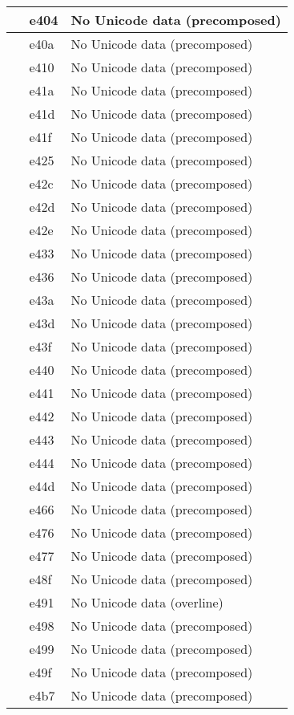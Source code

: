\documentclass[12pt,letterpaper,openany]{book}
\begin{document}
\begin{center}
\begin{supertabular}{|m{0.25in}|m{0.5in}|m{4in}|}
 & e404 & No Unicode data (precomposed)\\\hline
 & e40a & No Unicode data (precomposed)\\\hline
 & e410 & No Unicode data (precomposed)\\\hline
 & e41a & No Unicode data (precomposed)\\\hline
 & e41d & No Unicode data (precomposed)\\\hline
 & e41f & No Unicode data (precomposed)\\\hline
 & e425 & No Unicode data (precomposed)\\\hline
 & e42c & No Unicode data (precomposed)\\\hline
 & e42d & No Unicode data (precomposed)\\\hline
 & e42e & No Unicode data (precomposed)\\\hline
 & e433 & No Unicode data (precomposed)\\\hline
 & e436 & No Unicode data (precomposed)\\\hline
 & e43a & No Unicode data (precomposed)\\\hline
 & e43d & No Unicode data (precomposed)\\\hline
 & e43f & No Unicode data (precomposed)\\\hline
 & e440 & No Unicode data (precomposed)\\\hline
 & e441 & No Unicode data (precomposed)\\\hline
 & e442 & No Unicode data (precomposed)\\\hline
 & e443 & No Unicode data (precomposed)\\\hline
 & e444 & No Unicode data (precomposed)\\\hline
 & e44d & No Unicode data (precomposed)\\\hline
 & e466 & No Unicode data (precomposed)\\\hline
 & e476 & No Unicode data (precomposed)\\\hline
 & e477 & No Unicode data (precomposed)\\\hline
 & e48f & No Unicode data (precomposed)\\\hline
 & e491 & No Unicode data (overline)\\\hline
 & e498 & No Unicode data (precomposed)\\\hline
 & e499 & No Unicode data (precomposed)\\\hline
 & e49f & No Unicode data (precomposed)\\\hline
 & e4b7 & No Unicode data (precomposed)\\\hline

\end{supertabular}
\end{center}
\end{document}
